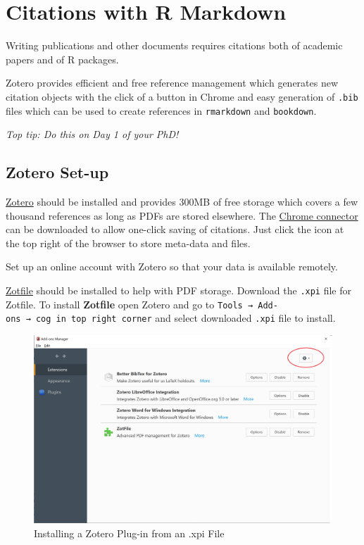 \documentclass[]{book}
\begin{document}
\hypertarget{citations-with-r-markdown}{%
\chapter{Citations with R Markdown}\label{citations-with-r-markdown}}

Writing publications and other documents requires citations both of academic papers and of R packages.

Zotero provides efficient and free reference management which generates new citation objects with the click of a button in Chrome and easy generation of \texttt{.bib} files which can be used to create references in \texttt{rmarkdown} and \texttt{bookdown}.

\emph{Top tip: Do this on Day 1 of your PhD!}

\hypertarget{zotero-set-up}{%
\section{Zotero Set-up}\label{zotero-set-up}}

\href{https://www.zotero.org/download/}{Zotero} should be installed and provides 300MB of free storage which covers a few thousand references as long as PDFs are stored elsewhere. The \href{https://www.zotero.org/download/}{Chrome connector} can be downloaded to allow one-click saving of citations. Just click the icon at the top right of the browser to store meta-data and files.

Set up an online account with Zotero so that your data is available remotely.

\href{https://www.zotero.org/support/plugins}{Zotfile} should be installed to help with PDF storage. Download the \texttt{.xpi} file for Zotfile. To install \textbf{Zotfile} open Zotero and go to \texttt{Tools\ →\ Add-ons\ →\ cog\ in\ top\ right\ corner} and select downloaded \texttt{.xpi} file to install.

\begin{figure}
\includegraphics[width=36.78in]{img/zotero_add_on_install} \caption{Installing a Zotero Plug-in from an .xpi File}\label{fig:add-on-install}
\end{figure}
\end{document}
